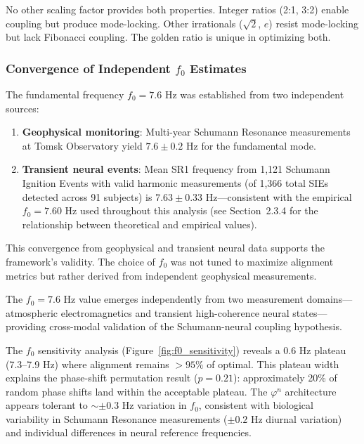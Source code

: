 \documentclass[11pt,a4paper]{article}
\newcommand{\phisym}{\varphi}
\newcommand{\fzero}{f_0}
\begin{document}
No other scaling factor provides both properties. Integer ratios (2:1, 3:2) enable coupling but produce mode-locking. Other irrationals ($\sqrt{2}$, $e$) resist mode-locking but lack Fibonacci coupling. The golden ratio is unique in optimizing both.

\subsubsection{Convergence of Independent $\fzero$ Estimates}

The fundamental frequency $\fzero = 7.6$ Hz was established from two independent sources:

\begin{enumerate}
    \item \textbf{Geophysical monitoring}: Multi-year Schumann Resonance measurements at Tomsk Observatory yield $7.6 \pm 0.2$ Hz for the fundamental mode.

    \item \textbf{Transient neural events}: Mean SR1 frequency from 1,121 Schumann Ignition Events with valid harmonic measurements (of 1,366 total SIEs detected across 91 subjects) is $7.63 \pm 0.33$ Hz---consistent with the empirical $\fzero = 7.60$ Hz used throughout this analysis (see Section~2.3.4 for the relationship between theoretical and empirical values).
\end{enumerate}

This convergence from geophysical and transient neural data supports the framework's validity. The choice of $\fzero$ was not tuned to maximize alignment metrics but rather derived from independent geophysical measurements.

\begin{keyinsight}
The $\fzero = 7.6$ Hz value emerges independently from two measurement domains---atmospheric electromagnetics and transient high-coherence neural states---providing cross-modal validation of the Schumann-neural coupling hypothesis.
\end{keyinsight}

The $\fzero$ sensitivity analysis (Figure~\ref{fig:f0_sensitivity}) reveals a 0.6 Hz plateau (7.3--7.9 Hz) where alignment remains $>95\%$ of optimal. This plateau width explains the phase-shift permutation result ($p = 0.21$): approximately 20\% of random phase shifts land within the acceptable plateau. The $\phisym^n$ architecture appears tolerant to $\sim\pm0.3$ Hz variation in $\fzero$, consistent with biological variability in Schumann Resonance measurements ($\pm 0.2$ Hz diurnal variation) and individual differences in neural reference frequencies.
\end{document}
